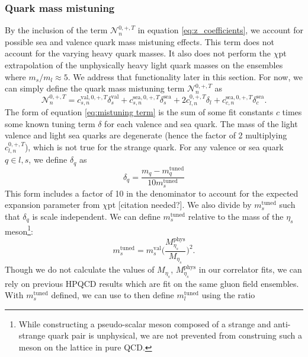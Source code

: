 \subsubsection{Quark mass mistuning}
By the inclusion of the term $\mathcal{N}^{0,+,T}_n$ in equation \ref{eq:z_coefficients}, we account for possible sea and valence quark mass mistuning effects.  This term does not account for the varying heavy quark masses. It also does not perform the $\chi$pt extrapolation of the unphysically heavy light quark masses on the ensembles where $m_s/m_l \approx 5$. We address that functionality later in this section. For now, we can simply define the quark mass mistuning term $\mathcal{N}^{0,+,T}_n$ as
\begin{equation}\label{eq:mistuning term}
        \mathcal{N}_n^{0,+,T}={c_{s,n}^{\mathrm{val},0,+,T}\delta_s^{\mathrm{val}}+c_{s,n}^{\mathrm{sea},0,+,T}\delta_s^{\mathrm{sea}}+2c_{l,n}^{0,+,T}\delta_l}+c_{c,n}^{\mathrm{sea},0,+,T}\delta_c^{\mathrm{sea}}.
    \end{equation}
The form of equation \ref{eq:mistuning term} is the sum of some fit constants $c$ times some known tuning term $\delta$ for each valence and sea quark.  The mass of the light valence and light sea quarks are degenerate (hence the factor of 2 multiplying $c_{l,n}^{0,+,T}$), which is not true for the strange quark. For any valence or sea quark $q\in{l,s}$, we define $\delta_q$ as
\begin{equation}\label{eq:delta_q}
    \delta_q = \frac{m_q - m_q^\mathrm{tuned}}{10m_s^\mathrm{tuned}}
\end{equation}
This form includes a factor of 10 in the denominator to account for the expected expansion parameter from $\chi$pt [citation needed?].  We also divide by $m_s^\mathrm{tuned}$ such that $\delta_q$ is scale independent.  We can define $m_s^\mathrm{tuned}$ relative to the mass of the $\eta_s$ meson\footnote{While constructing a pseudo-scalar meson composed of a strange and anti-strange quark pair is unphysical, we are not prevented from construing such a meson on the lattice in pure QCD.}:     
\begin{equation}\label{eq:mstuned}
  m_s^{\mathrm{tuned}}=m_s^{\mathrm{val}}\Bigg(\frac{M_{\eta_s}^{\mathrm{phys}}}{M_{\eta_s}}\Bigg)^2.
\end{equation}
Though we do not calculate the values of $M_{\eta_s}$, $M^{\mathrm{phys}}_{\eta_s}$ in our correlator fits, we can rely on previous HPQCD results \cite{Will_towardsB, PhysRevD.88.074504} which are fit on the same gluon field ensembles.  With $m_s^{\mathrm{tuned}}$ defined, we can use \cite{PhysRevD.98.074512} to then define $m_l^{\mathrm{tuned}}$ using the ratio
